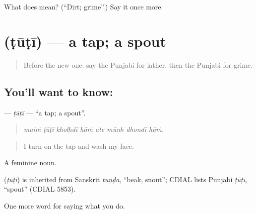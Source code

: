 \begin{tcolorbox}[breakable,colback=teal!4,colframe=teal!35!black,title={Before you move on}]
What does  mean? (\textquotedblleft{}Dirt; grime\textquotedblright{}.) Say it once more.
\end{tcolorbox}
\section[\texorpdfstring{\pa{ਟੂਟੀ} (ṭūṭī)}{ਟੂਟੀ (ṭūṭī)}]{ (ṭūṭī) — a tap; a spout}

\label{lesson:PA-C227-tuti}



\begin{quote}
Before the new one: say the Punjabi for lather, then the Punjabi for grime.
\end{quote}

\subsection*{You'll want to know: }
\textbf{} — \emph{ṭūṭī} — \textquotedblleft{}a tap; a spout\textquotedblright{}.

\begin{quote}
       
\end{quote}

\begin{quote}
\emph{maiṁ ṭūṭī kholhdī hāṁ ate mūnh dhondī hāṁ.}
\end{quote}

\begin{quote}
I turn on the tap and wash my face.
\end{quote}

A feminine noun.

\begin{cousinweb}
\textbf{} (\emph{ṭūṭī}) is inherited from Sanskrit \emph{tuṇḍa}, \textquotedblleft{}beak, snout\textquotedblright{}; CDIAL lists Punjabi \emph{ṭūṭī}, \textquotedblleft{}spout\textquotedblright{} (CDIAL 5853).
\end{cousinweb}

\begin{grammarlens}[title={What you've built}]
One more word for saying what you do.
\end{grammarlens}

